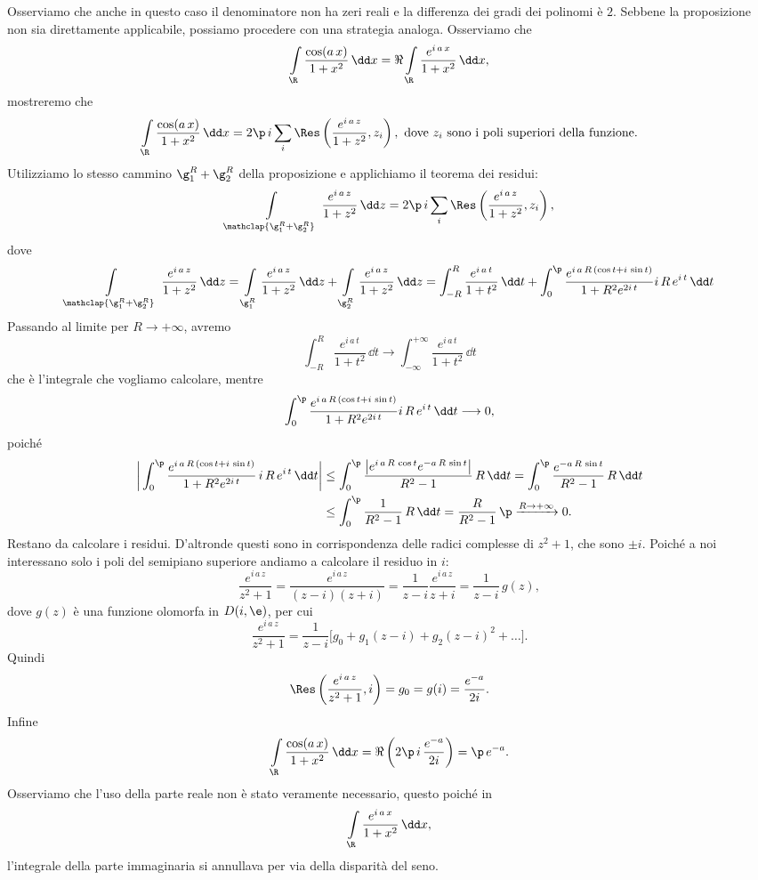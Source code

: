 \begin{sol}
	Osserviamo che anche in questo caso il denominatore non ha zeri reali e la differenza dei gradi dei polinomi è \(2\).
	Sebbene la proposizione non sia direttamente applicabile, possiamo procedere con una strategia analoga. Osserviamo che
	\[
		\int\limits_\R \frac{\cos(a\,x)}{1+x^2}\,\dd x = \Re \int\limits_\R \frac{e^{i\,a\,x}}{1+x^2}\,\dd x,
	\]
	mostreremo che
	\[
		\int\limits_\R \frac{\cos(a\,x)}{1+x^2}\,\dd x = 2\p\,i \sum_i \Res \left( \frac{e^{i\,a\,z}}{1+z^2},z_i \right), \text{ dove \(z_i\) sono i poli superiori della funzione}.
	\]
	Utilizziamo lo stesso cammino \(\g_1^R+\g_2^R\) della proposizione e applichiamo il teorema dei residui:
	\[
		\int\limits_{\mathclap{\g_1^R+\g_2^R}}\, \frac{e^{i\,a\,z}}{1+z^2}\,\dd z = 2\p\,i \sum_{i} \Res \left( \frac{e^{i\,a\,z}}{1+z^2},z_i \right),
	\]
	dove
	\[
		\int\limits_{\mathclap{\g_1^R+\g_2^R}}\, \frac{e^{i\,a\,z}}{1+z^2}\,\dd z = \int\limits_{\g_1^R} \frac{e^{i\,a\,z}}{1+z^2}\,\dd z + \int\limits_{\g_2^R} \frac{e^{i\,a\,z}}{1+z^2}\,\dd z = \int_{-R}^R \frac{e^{i\,a\,t}}{1+t^2}\,\dd t + \int_0^\p \frac{e^{i\,a\,R\,(\cos t+i\,\sin t)}}{1+R^2 e^{2i\,t}}i\,R\,e^{i\,t}\,\dd t
	\]
	Passando al limite per \(R\to +\infty\), avremo
	\[
		\int_{-R}^R \frac{e^{i\,a\,t}}{1+t^2}\,\dd t \longrightarrow \int_{-\infty}^{+\infty} \frac{e^{i\,a\,t}}{1+t^2}\,\dd t
	\]
	che è l'integrale che vogliamo calcolare, mentre
	\[
		\int_0^\p \frac{e^{i\,a\,R\,(\cos t+i\,\sin t)}}{1+R^2 e^{2i\,t}}i\,R\,e^{i\,t}\,\dd t \longrightarrow 0,
	\]
	poiché
	\[
		\begin{split}
			\bigg\lvert \int_0^\p \frac{e^{i\,a\,R\,(\cos t+i\,\sin t)}}{1+R^2 e^{2i\,t}}\,i\,R\,e^{i\,t}\,\dd t \bigg\rvert & \le \int_0^\p \frac{\big\lvert e^{i\,a\,R\,\cos t}e^{-a\,R\,\sin t}\big\rvert}{R^2-1}\,R\,\dd t = \int_0^\p \frac{e^{-a\,R\,\sin t}}{R^2-1}\,R\,\dd t\\
			& \le \int_0^\p \frac{1}{R^2-1}\,R\,\dd t = \frac{R}{R^2-1}\,\p \xrightarrow{R\to+\infty} 0.
		\end{split}
	\]
	Restano da calcolare i residui.
	D'altronde questi sono in corrispondenza delle radici complesse di \(z^2+1\), che sono \(\pm i\). Poiché a noi interessano solo i poli del semipiano superiore andiamo a calcolare il residuo in \(i\):
	\[
		\frac{e^{i\,a\,z}}{z^2+1} = \frac{e^{i\,a\,z}}{(z-i)(z+i)} = \frac{1}{z-i} \frac{e^{i\,a\,z}}{z+i} = \frac{1}{z-i}\,g(z),
	\]
	dove \(g(z)\) è una funzione olomorfa in \(D(i,\e)\), per cui
	\[
		\frac{e^{i\,a\,z}}{z^2+1} = \frac{1}{z-i} \big[g_0+g_1(z-i)+g_2(z-i)^2+\ldots\big].
	\]
	Quindi
	\[
		\Res \left( \frac{e^{i\,a\,z}}{z^2+1},i \right) = g_0 = g(i) = \frac{e^{-a}}{2i}.
	\]
	Infine
	\[
		\int\limits_\R \frac{\cos(a\,x)}{1+x^2}\,\dd x = \Re \left( 2\p\,i\,\frac{e^{-a}}{2i} \right) = \p\,e^{-a}.
	\]
	Osserviamo che l'uso della parte reale non è stato veramente necessario, questo poiché in
	\[
		\int\limits_\R \frac{e^{i\,a\,x}}{1+x^2}\,\dd x,
	\]
	l'integrale della parte immaginaria si annullava per via della disparità del seno.
\end{sol}


